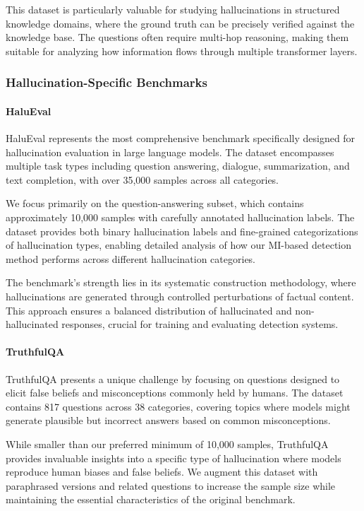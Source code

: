 This dataset is particularly valuable for studying hallucinations in structured knowledge domains, where the ground truth can be precisely verified against the knowledge base. The questions often require multi-hop reasoning, making them suitable for analyzing how information flows through multiple transformer layers.

\subsubsection{Hallucination-Specific Benchmarks}

\paragraph{HaluEval}
HaluEval \citep{li2023halueval} represents the most comprehensive benchmark specifically designed for hallucination evaluation in large language models. The dataset encompasses multiple task types including question answering, dialogue, summarization, and text completion, with over 35,000 samples across all categories.

We focus primarily on the question-answering subset, which contains approximately 10,000 samples with carefully annotated hallucination labels. The dataset provides both binary hallucination labels and fine-grained categorizations of hallucination types, enabling detailed analysis of how our MI-based detection method performs across different hallucination categories.

The benchmark's strength lies in its systematic construction methodology, where hallucinations are generated through controlled perturbations of factual content. This approach ensures a balanced distribution of hallucinated and non-hallucinated responses, crucial for training and evaluating detection systems.

\paragraph{TruthfulQA}
TruthfulQA \citep{lin2021truthfulqa} presents a unique challenge by focusing on questions designed to elicit false beliefs and misconceptions commonly held by humans. The dataset contains 817 questions across 38 categories, covering topics where models might generate plausible but incorrect answers based on common misconceptions.

While smaller than our preferred minimum of 10,000 samples, TruthfulQA provides invaluable insights into a specific type of hallucination where models reproduce human biases and false beliefs. We augment this dataset with paraphrased versions and related questions to increase the sample size while maintaining the essential characteristics of the original benchmark.

